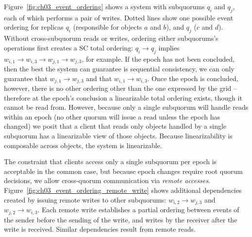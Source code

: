 Figure~\ref{fig:ch03_event_ordering} shows a system with subquorums $q_i$ and $q_j$, each of which performs a pair of writes.
Dotted lines show one possible event ordering for replicas $q_i$ (responsible for objects $a$ and $b$), and $q_j$ ($c$ and $d$).
Without cross-subquorum reads or writes, ordering either subquorums's operations first creates a SC total ordering: $q_i \rightarrow q_j$ implies $w_{i,1} \rightarrow w_{i,3} \rightarrow w_{j,1} \rightarrow w_{j,3}$, for example.
If the epoch has not been concluded, then the best the system can guarantee is sequential consistency, we can only guarantee that $w_{j,1} \rightarrow w_{j,3}$ and that $w_{i,1} \rightarrow w_{i,3}$.
Once the epoch is concluded, however, there is no other ordering other than the one expressed by the grid -- therefore at the epoch's conclusion a linearizable total ordering exists, though it cannot be read from.
However, because only a single subquorum will handle reads within an epoch (no other quorum will issue a read unless the epoch has changed) we posit that a client that reads only objects handled by a single subquorum has a linearizable view of those objects.
Because linearizability is composable across objects, the system is linearizable.

The constraint that clients access only a single subquorum per epoch is acceptable in the common case, but because epoch changes require root quorum decisions, we allow cross-quorum communication via \emph{remote accesses}.
Figure~\ref{fig:ch03_event_ordering_remote_write} shows additional dependencies created by issuing remote writes to other subquorums: $w_{i,2} \rightarrow w_{j,3}$ and $w_{j,2} \rightarrow w_{i,3}$.
Each remote write establishes a partial ordering between events of the sender before the sending of the write, and writes by the receiver after the write is received.
Similar dependencies result from remote reads.

